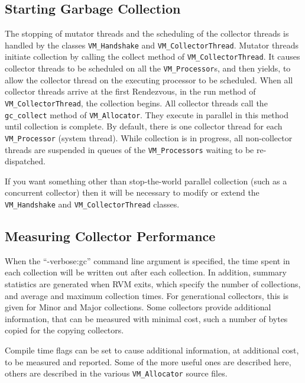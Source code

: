 \subsection{Starting Garbage Collection} \label{sssec:startgc}
The stopping of mutator threads and the scheduling of the collector
threads is handled by the classes 
{\tt VM\_Handshake} and {\tt VM\_CollectorThread}.
Mutator threads initiate collection by calling the collect method
of {\tt VM\_CollectorThread}.  It causes collector threads to be scheduled
on all the {\tt VM\_Processor}s, and then yields, to allow the collector thread
on the executing processor to be scheduled. When all collector threads
arrive at the first Rendezvous, in the run method of {\tt
VM\_CollectorThread}, the collection begins.
All collector threads 
call the {\tt gc\_collect} method of {\tt VM\_Allocator}.  They execute
in parallel in this method until collection is complete.  By default,
there is one collector thread for each {\tt VM\_Processor} (system thread).
While collection is in progress, all non-collector threads are suspended
in queues of the {\tt VM\_Processors} waiting to be re-dispatched.

If you want something other than stop-the-world parallel collection 
(such as a concurrent collector) then it will be necessary to modify
or extend the {\tt VM\_Handshake} and {\tt VM\_CollectorThread} classes.

\subsection{Measuring Collector Performance} \label{sssec:verbosegc}
When the ``-verbose:gc'' command line argument is specified, the time
spent in each collection will be written out after each collection.
In addition, summary statistics are generated when RVM exits, which
specify the number of collections, and average and maximum collection times.
For generational collectors, this is given for Minor and Major collections.
Some collectors provide additional information, that can be measured
with minimal cost, such a number of bytes copied for the copying collectors.

Compile time flags can be set to cause additional information, at additional
cost, to be measured and reported.  Some of the more useful ones are
described here, others are described in the various {\tt VM\_Allocator}
source files.


